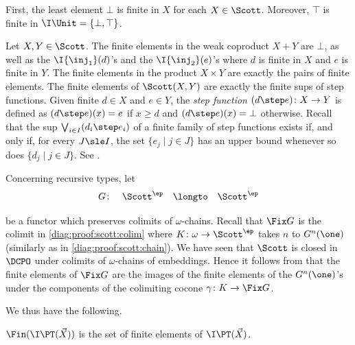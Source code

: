First, the least element $\bot$ is finite in $X$
for each $X \in \Scott$.
Moreover, $\top$ is finite in $\I\Unit = \{\bot,\top\}$.



Let $X,Y \in \Scott$.
The finite elements in the weak coproduct $X + Y$
are $\bot$,
as well as the $\I{\inj_1}(d)$'s 
and the $\I{\inj_2}(e)$'s
where $d$ is finite in $X$ and $e$ is finite in $Y$.
%
The finite elements in the product $X \times Y$
are exactly the pairs of finite elements.
The finite elements of $\Scott(X,Y)$ are exactly the finite sups of step functions.
Given finite $d \in X$ and $e \in Y$,
the \emph{step function} $(d \step e) \colon X \to Y$
is defined as $(d \step e)(x) = e$ if $x \geq d$ and
$(d \step e)(x)= \bot$ otherwise.
Recall that the sup $\bigvee_{i \in I}(d_i \step e_i)$ of 
a finite family of step functions exists
if, and only if,
for every $J \sle I$, the set $\{e_j \mid j \in J\}$ has an upper bound
whenever so does $\{d_j \mid j \in J\}$.
See \cite[Theorem 1.4.12]{ac98book}.


Concerning recursive types, let 
\[
\begin{array}{*{4}{l}}
  G \colon
& \Scott^\ep
& \longto
& \Scott^\ep
\end{array}
\]

\noindent
be a functor which preserves colimits of $\omega$-chains.
Recall that $\Fix G$ is the colimit in \eqref{diag:proof:scott:colim}
where $K \colon \omega \to \Scott^\ep$
takes $n$ to $G^n(\one)$
(similarly as in \eqref{diag:proof:scott:chain}).
We have seen that $\Scott$ is closed in $\DCPO$
under colimits of $\omega$-chains of embeddings.
Hence it follows from \cite[Theorem 3.3.11]{aj95chapter}
that the finite elements of $\Fix G$
are the images of the finite elements of the $G^n(\one)$'s
under the components of the colimiting cocone
$\gamma \colon K \to \Fix G$.

We thus have the following.

\begin{proposition}
\label{prop:proof:scott:fin}
$\Fin(\I\PT(\vec X))$ is the set of finite elements of $\I\PT(\vec X)$.
\end{proposition}





